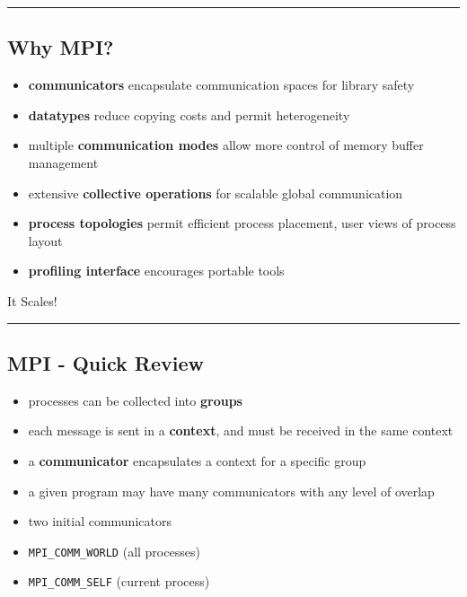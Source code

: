 \documentclass{article}
\begin{document}
    \begin{center}\rule{3in}{0.4pt}\end{center}

\subsection{Why MPI?}\label{why-mpi}

\begin{itemize}
\itemsep1pt\parskip0pt
\item
  \textbf{communicators} encapsulate communication spaces for library
  safety
\item
  \textbf{datatypes} reduce copying costs and permit heterogeneity
\item
  multiple \textbf{communication modes} allow more control of memory
  buffer management
\item
  extensive \textbf{collective operations} for scalable global
  communication
\item
  \textbf{process topologies} permit efficient process placement, user
  views of process layout
\item
  \textbf{profiling interface} encourages portable tools
\end{itemize}

It Scales!

    \begin{center}\rule{3in}{0.4pt}\end{center}

\subsection{MPI - Quick Review}\label{mpi---quick-review}

\begin{itemize}
\item
  processes can be collected into \textbf{groups}
\item
  each message is sent in a \textbf{context}, and must be received in
  the same context
\item
  a \textbf{communicator} encapsulates a context for a specific group
\item
  a given program may have many communicators with any level of overlap
\item
  two initial communicators
\item
  \texttt{MPI\_COMM\_WORLD} (all processes)
\item
  \texttt{MPI\_COMM\_SELF} (current process)
\end{itemize}
\end{document}
